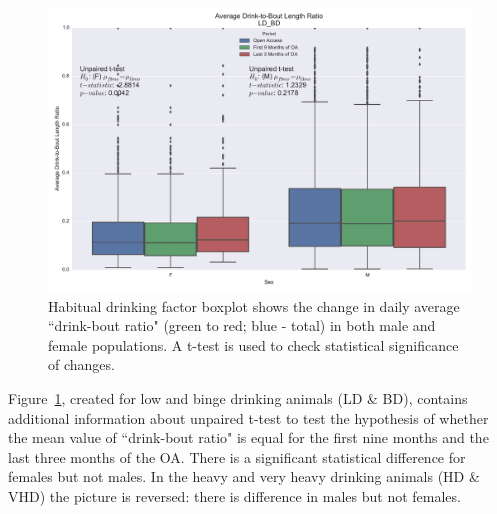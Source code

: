	\begin{figure}[ht]
		\centering
		\includegraphics[width=1.1\linewidth]{figures/habitual_boxplots_mf_ttest.pdf}
		\caption{Habitual drinking factor boxplot shows the change in daily average ``drink-bout ratio" (green to red; blue - total) in both male and female populations. A t-test is used to check statistical significance of  changes.}
		\label{fig:habitual-boxplots-mf}
	\end{figure}
	
	Figure~\ref{fig:habitual-boxplots-mf}, created for low and binge drinking animals (LD \& BD), contains additional information about unpaired t-test to test the hypothesis of whether the mean value of ``drink-bout ratio" is equal for the first nine months and the last three months of the OA. There is a significant statistical difference for females but not males. In the heavy and very heavy drinking animals (HD \& VHD) the picture is reversed: there is difference in males but not females.	
	

